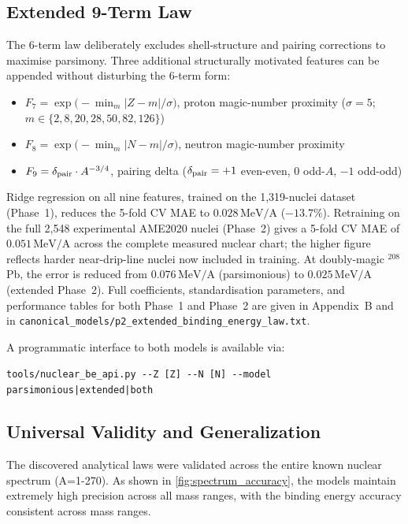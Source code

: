 \documentclass[9pt,twocolumn]{extarticle}
\begin{document}
\subsection{Extended 9-Term Law}
\label{sec:extended-law}

The 6-term law deliberately excludes shell-structure and pairing corrections to maximise parsimony.
Three additional structurally motivated features can be appended without disturbing the 6-term form:

\begin{itemize}[nosep]
\item $F_7 = \exp\bigl(-\min_{m}|Z-m|/\sigma\bigr)$, proton magic-number proximity ($\sigma=5$; $m \in \{2,8,20,28,50,82,126\}$)
\item $F_8 = \exp\bigl(-\min_{m}|N-m|/\sigma\bigr)$, neutron magic-number proximity
\item $F_9 = \delta_{\rm pair} \cdot A^{-3/4}$, pairing delta ($\delta_{\rm pair} = +1$ even-even, $0$ odd-$A$, $-1$ odd-odd)
\end{itemize}

Ridge regression on all nine features, trained on the 1,319-nuclei dataset (Phase~1), reduces the 5-fold CV MAE to $0.028\,\mathrm{MeV/A}$ ($-13.7\%$).
Retraining on the full 2,548 experimental AME2020 nuclei (Phase~2) gives a 5-fold CV MAE of $0.051\,\mathrm{MeV/A}$ across the complete measured nuclear chart; the higher figure reflects harder near-drip-line nuclei now included in training.
At doubly-magic $^{208}$Pb, the error is reduced from $0.076\,\mathrm{MeV/A}$ (parsimonious) to $0.025\,\mathrm{MeV/A}$ (extended Phase~2).
Full coefficients, standardisation parameters, and performance tables for both Phase~1 and Phase~2 are given in Appendix~B and in \texttt{canonical\_models/p2\_extended\_binding\_energy\_law.txt}.

A programmatic interface to both models is available via:
\begin{center}
\texttt{tools/nuclear\_be\_api.py -{}-Z [Z] -{}-N [N] -{}-model parsimonious|extended|both}
\end{center}

\subsection{Universal Validity and Generalization}
The discovered analytical laws were validated across the entire known nuclear spectrum (A=1-270). As shown in \cref{fig:spectrum_accuracy}, the models maintain extremely high precision across all mass ranges, with the binding energy accuracy consistent across mass ranges.
\end{document}
